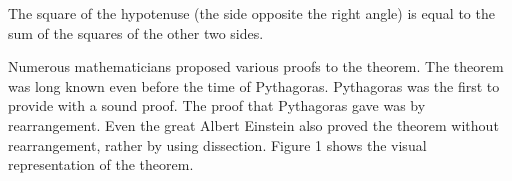\begin{theorem}
\label{pythagorean}
The square of the hypotenuse (the
side opposite the right angle) is equal to the sum of the squares of the other two
sides.
\end{theorem}

Numerous mathematicians proposed various proofs to the theorem. The
theorem was long known even before the time of Pythagoras. Pythagoras was
the first to provide with a sound proof. The proof that Pythagoras gave was
by rearrangement. Even the great Albert Einstein also proved the theorem
without rearrangement, rather by using dissection. Figure 1 shows the visual
representation of the theorem.
